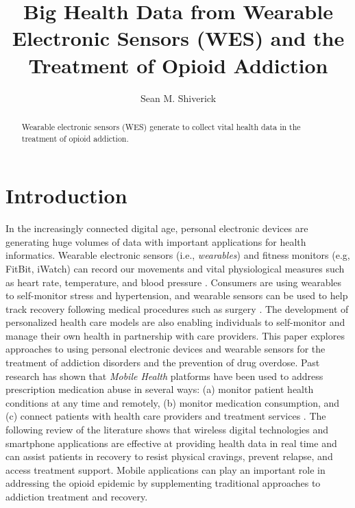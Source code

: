 \documentclass[sigconf]{acmart}
\begin{document}
\title{Big Health Data from Wearable Electronic Sensors (WES) and 
the Treatment of Opioid Addiction}

\author{Sean M. Shiverick}


\begin{abstract}
Wearable electronic sensors (WES) generate to collect
vital health data in the treatment of opioid addiction. 
\end{abstract}


\maketitle


\section{Introduction}

In the increasingly connected digital age, personal electronic devices are 
generating huge volumes of data with important applications for health 
informatics. Wearable electronic sensors (i.e., \emph{wearables}) and fitness 
monitors (e.g, FitBit, iWatch) can record our movements and vital physiological 
measures such as heart rate, temperature, and blood pressure \cite{metcalf16}. 
Consumers are using wearables to self-monitor stress and hypertension, and 
wearable sensors can be used to help track recovery following medical procedures 
such as surgery \cite{atallah11}. The development of personalized health care 
models are also enabling individuals to self-monitor and manage their own health 
in partnership with care providers. This paper explores approaches to using 
personal electronic devices and wearable sensors for the treatment of addiction 
disorders and the prevention of drug overdose. Past research has shown that 
\emph{Mobile Health} platforms have been used to address prescription medication 
abuse in several ways: (a) monitor patient health conditions at any time and 
remotely, (b) monitor medication consumption, and (c) connect patients with 
health care providers and treatment services \cite{Varshney14}. The following 
review of the literature shows that wireless digital technologies and smartphone
applications are effective at providing health data in real time and can assist 
patients in recovery to resist physical cravings, prevent relapse, and access 
treatment support. Mobile applications can play an important role in addressing 
the opioid epidemic by supplementing traditional approaches to addiction treatment 
and recovery. 
\end{document}
